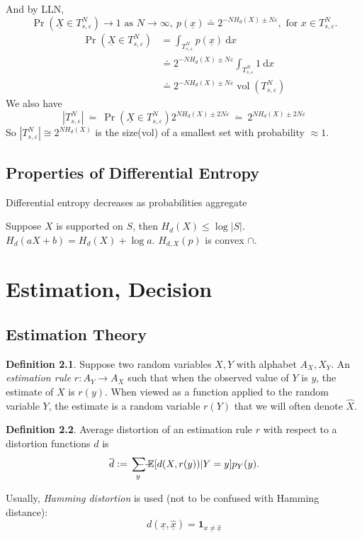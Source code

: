 \documentclass{report}
\newcommand{\matE}{\mathbb{E}}
\newcommand{\idf}{\ \mathrm{d}}
\newcommand{\ddoteq}{\ \ddot{=}\ }
\def \ssumsym {\mathrlap{\ \ --}\sum}
\DeclareMathOperator*{\ssum}{\ssumsym}
\newcommand{\defeq}{\vcentcolon=}
\theoremstyle{definition}
\newtheorem{definition}{Definition}[section]
\theoremstyle{remark}
\numberwithin{equation}{section}
\begin{document}
And by LLN, \[
\Pr(\underline{X} \in T_{s,\varepsilon}^N) \to 1 \text{ as } N \to \infty,\ p(\underline{x}) \doteq 2^{-NH_d(X)\pm N\varepsilon}, \text{ for } x \in T_{s, \varepsilon}^N.
\]
\begin{align*}
  \Pr\left(\underline{X} \in T_{s,\varepsilon}^N\right) & = \int_{T_{s, \varepsilon}^N}p(\underline{x}) \idf x \\
  & \doteq 2^{-NH_d(X)\pm N\varepsilon} \int_{T_{s, \varepsilon}^N} 1 \idf x \\
  & \doteq 2^{-NH_d(X)\pm N\varepsilon} \operatorname{vol}(T_{s, \varepsilon}^N)
\end{align*}
We also have \[|T_{s,\varepsilon}^N| \ddoteq \Pr(\underline{X} \in T_{s, \varepsilon}^N)2^{NH_d(X)\pm2N\varepsilon}\ddoteq 2^{NH_d(X)\pm2N\varepsilon}\]
So \(|T_{s,\varepsilon}^N| \cong 2^{NH_d(X)}\) is the size(vol) of a smallest set with probability $\approx 1$.

\section{Properties of Differential Entropy}

Differential entropy decreases as probabilities aggregate

Suppose $X$ is supported on $S$, then $H_d(X) \leq \log |S|$.
$H_{d}(aX+b) = H_d(X) + \log a$.
$H_{d, X}(p)$ is convex $\cap$.

\chapter{Estimation, Decision}

\section{Estimation Theory}
\begin{definition}
  Suppose two random variables $X, Y$ with alphabet $A_X, X_Y$. An \emph{estimation rule} $r: A_Y \to A_X$ such that when the observed value of $Y$ is $y$, the estimate of $X$ is $r(y)$. When viewed as a function applied to the random variable $Y$, the estimate is a random variable $r(Y)$ that we will often denote $\widehat{X}$.
\end{definition}
\begin{definition}
  Average distortion of an estimation rule $r$ with respect to a distortion functions $d$ is \[\overline{d}\defeq \ssum_{y} \matE[d(X, r(y))| Y = y]p_Y(y).\]
\end{definition}
Usually, \emph{Hamming distortion} is used (not to be confused with Hamming distance):
\[
d(\underline{x}, \widehat{\underline{x}}) = \mathbf{1}_{x \neq \widehat{\underline{x}}}  
\]
\end{document}
